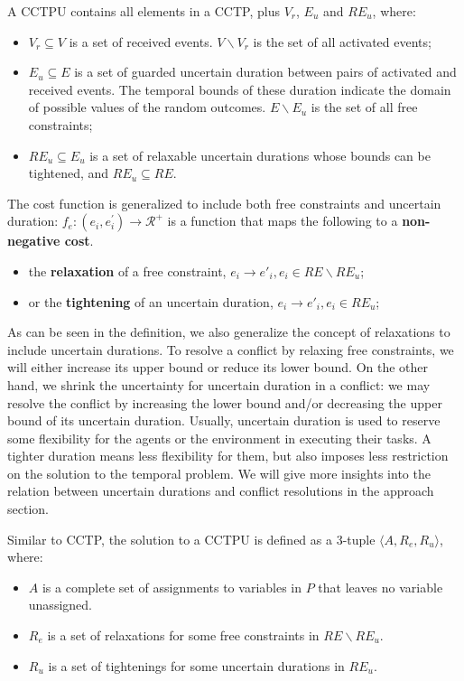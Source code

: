 \documentclass[jair,twoside,11pt,theapa]{article}
\begin{document}
\begin{mydef}
\label{def:CCTPU}
	A CCTPU contains all elements in a CCTP, plus $V_r$, $E_u$ and $RE_u$, where:
	
	\begin{itemize}
		\item $V_r\subseteq V$ is a set of received events. $V\backslash V_r$ is the
set of all activated events; 
		\item $E_u\subseteq E$ is a set of guarded uncertain duration between pairs of
activated and received events. The temporal bounds of these duration indicate the domain of possible values of the random outcomes. $E\backslash E_u$ is the set of all free constraints;
		\item $RE_u\subseteq E_u$ is a set of relaxable uncertain durations whose
		bounds can be tightened, and $RE_u\subseteq RE$.
	\end{itemize}
	
	The cost function is generalized to include both free constraints and uncertain
duration: $f_e:(e_i,e_i^{\prime})\rightarrow \mathcal{R}^{+}$ is a
	function that maps the following to a \textbf{non-negative cost}.
	\begin{itemize}
		\item the \textbf{relaxation} of a free constraint, $e_i\rightarrow
		e'_i,e_i\in RE\backslash RE_u$;
		\item or the \textbf{tightening} of an uncertain duration, $e_i\rightarrow
		e'_i,e_i\in RE_u$;
	\end{itemize}
	
\end{mydef}

As can be seen in the definition, we also generalize the concept of relaxations to include uncertain durations. To resolve a conflict by relaxing free constraints, we will either increase its upper bound or reduce its lower bound. On the other hand, we shrink the uncertainty for uncertain duration in a conflict: we may resolve the
conflict by increasing the lower bound and/or decreasing the upper bound of its
uncertain duration. Usually, uncertain duration is used to reserve some
flexibility for the agents or the environment in executing their tasks. A
tighter duration means less flexibility for them, but also imposes less
restriction on the solution to the temporal problem. We will give more insights
into the relation between uncertain durations and conflict resolutions in the
approach section. 


Similar to CCTP, the solution to a CCTPU is defined as a 3-tuple $\langle A,R_e,R_u\rangle$, where:
\begin{itemize}
	\item $A$ is a complete set of assignments to variables in $P$ that leaves
	no variable unassigned.
	\item $R_e$ is a set of relaxations for some free constraints
	in $RE\backslash RE_u$.
	\item $R_u$ is a set of tightenings for some uncertain durations in $RE_u$.
\end{itemize}
\end{document}
